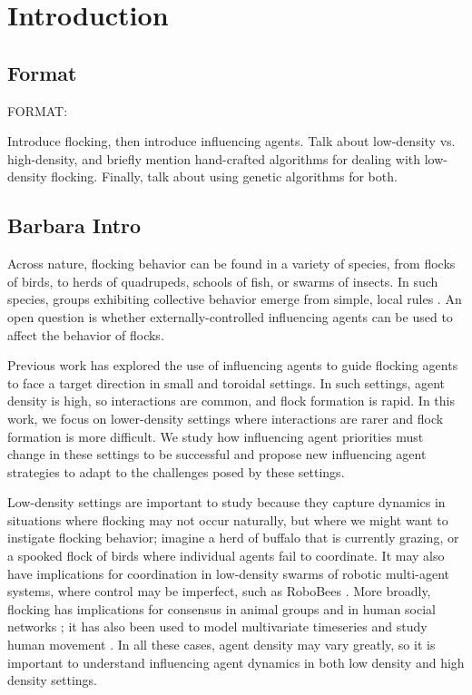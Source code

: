 \chapter{Introduction}
\label{introduction}

\section{Format}
FORMAT:

Introduce flocking, then introduce influencing agents. Talk about low-density
vs. high-density, and briefly mention hand-crafted algorithms for dealing with
low-density flocking. Finally, talk about using genetic algorithms for both.

\section{Barbara Intro}

Across nature, flocking behavior can be found in a variety of species, from 
flocks of birds, to herds of quadrupeds, schools of fish, or swarms of insects.
In such species, groups exhibiting collective behavior emerge from simple, 
local rules \cite{sumpter2010collective}.
An open question is whether externally-controlled influencing agents can be 
used to affect the behavior of flocks.

Previous work \cite{genter2013backsearch, genter2013visionstationary, 
genter2014neighborsorientherd, genter2015placement, genter2016facegoalfacecurrent, 
genter201612steplookahead, genterthesis}
has explored the use of influencing agents to guide flocking 
agents to face a target direction in small and toroidal settings.
In such settings, agent density is high, so interactions are common, and flock
formation is rapid.
In this work, we focus on lower-density settings where interactions are rarer
and flock formation is more difficult.
We study how influencing agent priorities must change in these settings to be
successful and propose new influencing agent strategies to adapt to the
challenges posed by these settings.

Low-density settings are important to study because they capture dynamics in
situations where flocking may not occur naturally, but where we might want to
instigate flocking behavior; imagine a herd of buffalo that is currently
grazing, or a spooked flock of birds where individual agents fail to
coordinate.
It may also have implications for coordination in low-density swarms of
robotic multi-agent systems, where control may be imperfect, such as RoboBees
\cite{Chen2017Robobees}.
More broadly, flocking has implications for consensus in animal groups
\cite{Yang2006Consensus, sumpter2008fish, couzin2005} and in human social
networks \cite{liang2012opinion};
it has also been used to model multivariate timeseries and study human
movement \cite{schruben2010multivariate, singham2011agentmovement}.
In all these cases, agent density may vary greatly, so it is important to
understand influencing agent dynamics in both low density and high density
settings.

